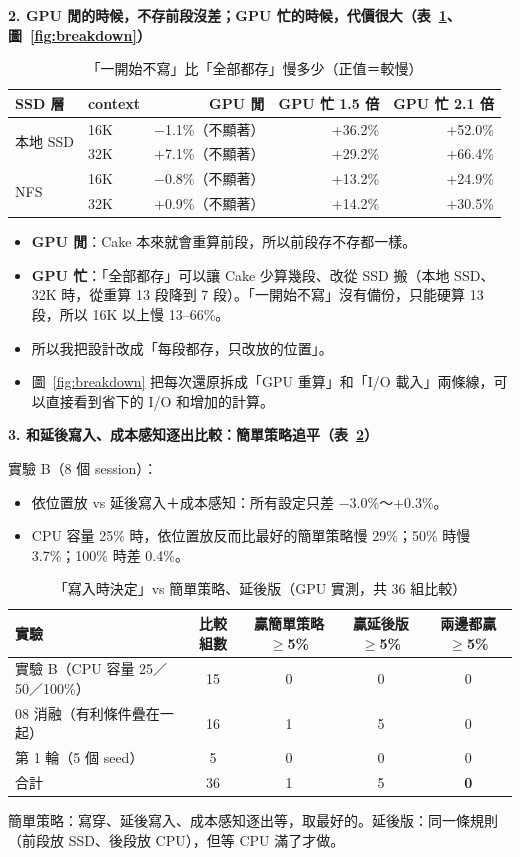 \documentclass[11pt,a4paper]{article}
\newcommand{\note}[1]{{\footnotesize\color{black!70}#1}}
\begin{document}
\textbf{2. GPU 閒的時候，不存前段沒差；GPU 忙的時候，代價很大（表~\ref{tab:q2}、圖~\ref{fig:breakdown}）}

\begin{table}[h]
\centering
\caption{「一開始不寫」比「全部都存」慢多少（正值＝較慢）}\label{tab:q2}
\begin{tabular}{llrrr}
\toprule
SSD 層 & context & GPU 閒 & GPU 忙 1.5 倍 & GPU 忙 2.1 倍 \\
\midrule
\multirow{2}{*}{本地 SSD} & 16K & −1.1\%（不顯著） & +36.2\% & +52.0\% \\
 & 32K & +7.1\%（不顯著） & +29.2\% & +66.4\% \\
\midrule
\multirow{2}{*}{NFS} & 16K & −0.8\%（不顯著） & +13.2\% & +24.9\% \\
 & 32K & +0.9\%（不顯著） & +14.2\% & +30.5\% \\
\bottomrule
\end{tabular}
\end{table}

\begin{itemize}
\item \textbf{GPU 閒}：Cake 本來就會重算前段，所以前段存不存都一樣。
\item \textbf{GPU 忙}：「全部都存」可以讓 Cake 少算幾段、改從 SSD 搬（本地 SSD、32K 時，從重算 13 段降到 7 段）。「一開始不寫」沒有備份，只能硬算 13 段，所以 16K 以上慢 13--66\%。
\item 所以我把設計改成「每段都存，只改放的位置」。
\item 圖~\ref{fig:breakdown} 把每次還原拆成「GPU 重算」和「I/O 載入」兩條線，可以直接看到省下的 I/O 和增加的計算。
\end{itemize}

\textbf{3. 和延後寫入、成本感知逐出比較：簡單策略追平（表~\ref{tab:q3}）}

實驗 B（8 個 session）：
\begin{itemize}
\item 依位置放 vs 延後寫入＋成本感知：所有設定只差 −3.0\%～+0.3\%。
\item CPU 容量 25\% 時，依位置放反而比最好的簡單策略慢 29\%；50\% 時慢 3.7\%；100\% 時差 0.4\%。
\end{itemize}

\begin{table}[h]
\centering
\caption{「寫入時決定」vs 簡單策略、延後版（GPU 實測，共 36 組比較）}\label{tab:q3}
\small
\begin{tabular}{lcccc}
\toprule
實驗 & 比較組數 & 贏簡單策略 $\geq$5\% & 贏延後版 $\geq$5\% & 兩邊都贏 $\geq$5\% \\
\midrule
實驗 B（CPU 容量 25／50／100\%） & 15 & 0 & 0 & 0 \\
08 消融（有利條件疊在一起） & 16 & 1 & 5 & 0 \\
第 1 輪（5 個 seed） & 5 & 0 & 0 & 0 \\
\midrule
合計 & 36 & 1 & 5 & \textbf{0} \\
\bottomrule
\end{tabular}

\vspace{2pt}
\note{簡單策略：寫穿、延後寫入、成本感知逐出等，取最好的。延後版：同一條規則（前段放 SSD、後段放 CPU），但等 CPU 滿了才做。}
\end{table}
\end{document}
